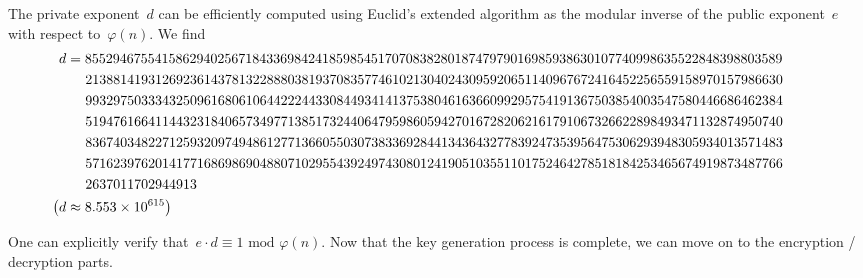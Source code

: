 \documentclass{article}
\begin{document}
\noindent The private exponent~$d$ can be efficiently computed using Euclid's extended algorithm as the modular inverse of the public exponent~$e$ with respect to~$\varphi(n)$.  We find
\begin{align*}
\hspace*{-1cm} d &= 8552946755415862940256718433698424185985451707083828018747979016985938630107740998635522848398803589 \\
\hspace*{-1cm} & \hspace{0.48cm} 2138814193126923614378132288803819370835774610213040243095920651140967672416452256559158970157986630  \\
\hspace*{-1cm} & \hspace{0.48cm} 9932975033343250961680610644222443308449341413753804616366099295754191367503854003547580446686462384 \\
\hspace*{-1cm} &  \hspace{0.48cm} 5194761664114432318406573497713851732440647959860594270167282062161791067326622898493471132874950740 \\
\hspace*{-1cm} & \hspace{0.48cm} 8367403482271259320974948612771366055030738336928441343643277839247353956475306293948305934013571483  \\
\hspace*{-1cm} & \hspace{0.48cm} 5716239762014177168698690488071029554392497430801241905103551101752464278518184253465674919873487766 \\
\hspace*{-1cm} & \hspace{0.48cm} 2637011702944913 \\
\hspace*{-1cm} \big( d&\approx 8.553 \times 10^{615} \big)
\end{align*}

\noindent One can explicitly verify that~$e \cdot d \equiv 1 \,\,\text{mod}\,\,\varphi(n)$.  Now that the key generation process is complete, we can move on to the encryption / decryption parts.
\end{document}
